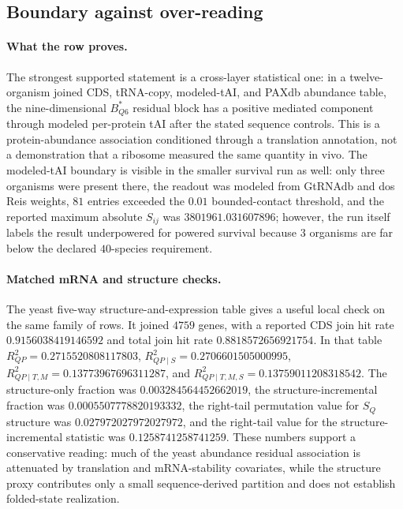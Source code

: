 \subsection{Boundary against over-reading}
\label{subsec:q6-translation-mediated-protein-abundance-boundary}

\paragraph{What the row proves.}
The strongest supported statement is a cross-layer statistical one: in a twelve-organism joined CDS, tRNA-copy, modeled-tAI, and PAXdb abundance table, the nine-dimensional $B^*_{Q6}$ residual block has a positive mediated component through modeled per-protein tAI after the stated sequence controls.  This is a protein-abundance association conditioned through a translation annotation, not a demonstration that a ribosome measured the same quantity in vivo.  The modeled-tAI boundary is visible in the smaller survival run as well: only three organisms were present there, the readout was modeled from GtRNAdb and dos Reis weights, $81$ entries exceeded the $0.01$ bounded-contact threshold, and the reported maximum absolute $S_{ij}$ was $3801961.031607896$; however, the run itself labels the result underpowered for powered survival because $3$ organisms are far below the declared $40$-species requirement.

\paragraph{Matched mRNA and structure checks.}
The yeast five-way structure-and-expression table gives a useful local check on the same family of rows.  It joined $4759$ genes, with a reported CDS join hit rate $0.9156038419146592$ and total join hit rate $0.8818572656921754$.  In that table $R^2_{QP}=0.2715520808117803$, $R^2_{QP\mid S}=0.2706601505000995$, $R^2_{QP\mid T,M}=0.13773967696311287$, and $R^2_{QP\mid T,M,S}=0.13759011208318542$.  The structure-only fraction was $0.003284564452662019$, the structure-incremental fraction was $0.0005507778820193332$, the right-tail permutation value for $S_Q$ structure was $0.027972027972027972$, and the right-tail value for the structure-incremental statistic was $0.1258741258741259$.  These numbers support a conservative reading: much of the yeast abundance residual association is attenuated by translation and mRNA-stability covariates, while the structure proxy contributes only a small sequence-derived partition and does not establish folded-state realization.

